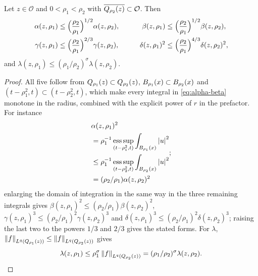 \documentclass[11pt,reqno]{amsart}
\begin{document}
\begin{lemma}\label{lem:monotonicity}
Let $z\in\mathcal{O}$ and $0<\rho_{1}<\rho_{2}$ with
$\overline{Q_{\rho_{2}}(z)}\subset\mathcal{O}$. Then
\begin{equation}\label{eq:monotonicity}
\begin{aligned}
  \alpha(z,\rho_{1})&\le\Bigl(\frac{\rho_{2}}{\rho_{1}}\Bigr)^{1/2}\alpha(z,\rho_{2}),
  &\qquad
  \beta(z,\rho_{1})&\le\Bigl(\frac{\rho_{2}}{\rho_{1}}\Bigr)^{1/2}\beta(z,\rho_{2}),\\
  \gamma(z,\rho_{1})&\le\Bigl(\frac{\rho_{2}}{\rho_{1}}\Bigr)^{2/3}\gamma(z,\rho_{2}),
  &\qquad
  \delta(z,\rho_{1})^{2}&\le\Bigl(\frac{\rho_{2}}{\rho_{1}}\Bigr)^{4/3}\delta(z,\rho_{2})^{2},
\end{aligned}
\end{equation}
and $\lambda(z,\rho_{1})\le(\rho_{1}/\rho_{2})^{\sigma}\lambda(z,\rho_{2})$.
\end{lemma}

\begin{proof}
All five follow from $Q_{\rho_{1}}(z)\subset Q_{\rho_{2}}(z)$,
$B_{\rho_{1}}(x)\subset B_{\rho_{2}}(x)$ and
$(t-\rho_{1}^{2},t)\subset(t-\rho_{2}^{2},t)$, which make every integral in
\eqref{eq:alpha-beta} monotone in the radius, combined with the explicit power of
$r$ in the prefactor. For instance
\[
\begin{aligned}
&\alpha(z,\rho_{1})^{2}
\\ &=\rho_{1}^{-1}\operatorname*{ess\,sup}_{(t-\rho_{1}^{2},t)}\int_{B_{\rho_{1}}(x)}\left\lvert u \right\rvert^{2}
\\ &\le\rho_{1}^{-1}\operatorname*{ess\,sup}_{(t-\rho_{2}^{2},t)}\int_{B_{\rho_{2}}(x)}\left\lvert u \right\rvert^{2}
\\ &=(\rho_{2}/\rho_{1})\alpha(z,\rho_{2})^{2}
\end{aligned}
;
\] enlarging the domain of
integration in the same way in the three remaining integrals gives
$\beta(z,\rho_{1})^{2}\le(\rho_{2}/\rho_{1})\beta(z,\rho_{2})^{2}$,
$\gamma(z,\rho_{1})^{3}\le(\rho_{2}/\rho_{1})^{2}\gamma(z,\rho_{2})^{3}$ and
$\delta(z,\rho_{1})^{3}\le(\rho_{2}/\rho_{1})^{2}\delta(z,\rho_{2})^{3}$;
raising the last two to the powers $1/3$ and $2/3$ gives the stated forms. For
$\lambda$, $\left\lVert f \right\rVert_{L^{q}(Q_{\rho_{1}}(z))}\le\left\lVert f \right\rVert_{L^{q}(Q_{\rho_{2}}(z))}$
gives
\[
\lambda(z,\rho_{1})\le\rho_{1}^{\sigma}\left\lVert f \right\rVert_{L^{q}(Q_{\rho_{2}}(z))}
=(\rho_{1}/\rho_{2})^{\sigma}\lambda(z,\rho_{2})
.
\]
\end{proof}
\end{document}
